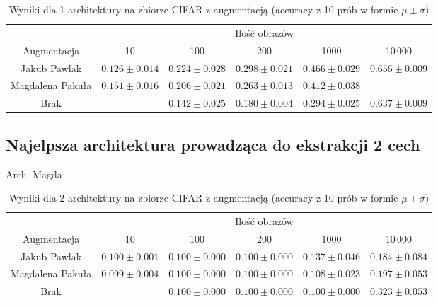 \documentclass[10pt]{article}
\begin{document}
\begin{table}[H]\centering
    \begin{tabular}{cccccc}
        \toprule
                         & \multicolumn{5}{c}{Ilość obrazów}                                                                                    \\ \cmidrule{2-6}
        Augmentacja      & 10                                & 100                & 200                & 1000              & 10\,000            \\ \midrule
        Jakub Pawlak     & $0.126 \pm 0.014 $                & $0.224 \pm 0.028 $ & $0.298 \pm 0.021 $ & $0.466 \pm 0.029$ & $0.656 \pm 0.009 $ \\
        Magdalena Pakuła & $0.151 \pm 0.016 $                &  $0.206 \pm 0.021$ & $0.263 \pm 0.013 $ & $0.412 \pm 0.038$                      \\
        Brak             &                                   & $0.142 \pm 0.025$  & $0.180 \pm 0.004$  & $0.294 \pm 0.025$ & $0.637 \pm 0.009$  \\
        \bottomrule
    \end{tabular}
    \caption{Wyniki dla 1 architektury na zbiorze CIFAR z augmentacją (accuracy z 10 prób w formie $\mu \pm \sigma$)}\label{tab:augmented_cifar_big}
\end{table}

\subsection*{Najelpsza architektura prowadząca do ekstrakcji 2 cech}

Arch. Magda

\begin{table}[H]\centering
    \begin{tabular}{cccccc}
        \toprule
                         & \multicolumn{5}{c}{Ilość obrazów}                                                                                    \\ \cmidrule{2-6}
        Augmentacja      & 10                                & 100                & 200                & 1000              & 10\,000            \\ \midrule
        Jakub Pawlak     & $0.100 \pm 0.001 $                & $ 0.100 \pm 0.000$ & $0.100 \pm 0.000 $ & $0.137 \pm 0.046$ & $0.184 \pm 0.084 $ \\
        Magdalena Pakuła & $0.099 \pm 0.004 $                & $0.100 \pm 0.000$ & $0.100 \pm 0.000 $ & $0.108 \pm 0.023$  & $0.197 \pm 0.053$   \\
        Brak             &                                   & $0.100 \pm 0.000$  & $0.100 \pm 0.000$  & $0.100 \pm 0.000$ & $0.323 \pm 0.053$  \\
        \bottomrule
    \end{tabular}
    \caption{Wyniki dla 2 architektury na zbiorze CIFAR z augmentacją (accuracy z 10 prób w formie $\mu \pm \sigma$)}\label{tab:augmented_cifar_small}
\end{table}
\end{document}
